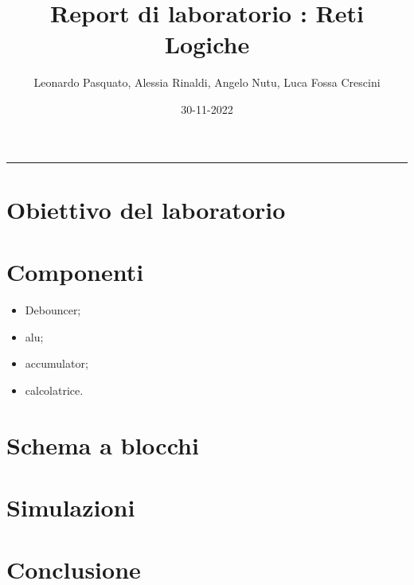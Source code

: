 \documentclass{article}
\title{\huge Report di laboratorio : Reti Logiche}
\author{Leonardo Pasquato, Alessia Rinaldi, Angelo Nutu, Luca Fossa Crescini}
\date{30-11-2022}
\begin{document}
    \maketitle
    \rule{\linewidth}{0.1mm}

    \section{Obiettivo del laboratorio}

    \section{Componenti}
    \begin{itemize}
        \item Debouncer;
        \item alu;
        \item accumulator;
        \item calcolatrice.
    \end{itemize}
    


    \section{Schema a blocchi}

    \section{Simulazioni}

    \section{Conclusione}
\end{document}
